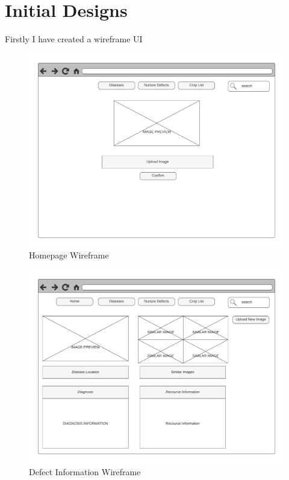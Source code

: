 \section{Initial Designs}
Firstly I have created a wireframe UI
  \begin{figure}[H]
    \begin{center}
      \includegraphics[scale=0.7]{Images/Home_Page_Wireframe}
      \caption{Homepage Wireframe}
      \label{fig:homepage_wireframe}
    \end{center}
  \end{figure}
  \begin{figure}[H]
    \begin{center}
      \includegraphics[scale=0.7]{Images/Defect_Information_Wireframe}
      \caption{Defect Information Wireframe}
      \label{fig:defect_wireframe}
    \end{center}
  \end{figure}
